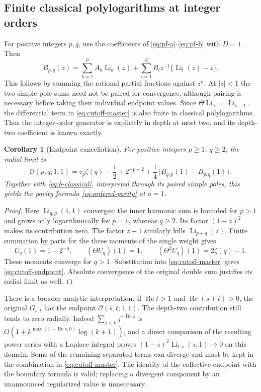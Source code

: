 \documentclass[11pt,a4paper]{article}
\numberwithin{equation}{section}
\newtheorem{corollary}[theorem]{Corollary}
\theoremstyle{definition}
\theoremstyle{remark}
\DeclareMathOperator{\Li}{Li}
\newcommand{\Rea}{\operatorname{Re}}
\newcommand{\Ord}{\mathcal O}
\begin{document}
\subsection{Finite classical polylogarithms at integer orders}

For positive integers $p,q$, use the coefficients of
\eqref{eq:pf-a}--\eqref{eq:pf-b} with $D=1$. Then
\begin{equation}\label{eq:b-classical}
 B_{p,q}(z)=\sum_{k=1}^{p}A_k\Li_k(z)
 +\sum_{l=1}^{q}B_lz^{-1}\{\Li_l(z)-z\}.
\end{equation}
This follows by summing the rational partial fractions against $z^n$.
At $|z|<1$ the two simple-pole sums need not be paired for convergence,
although pairing is necessary before taking their individual endpoint
values. Since $\Theta\Li_\nu=\Li_{\nu-1}$, the differential term in
\eqref{eq:cutoff-master} is also finite in classical polylogarithms.
Thus the integer-order generator is explicitly in depth at most two,
and its depth-two coefficient is known exactly.

\begin{corollary}[Endpoint cancellation]\label{cor:cutoff-endpoint}
For positive integers $p\ge1$, $q\ge2$, the radial limit is
\begin{equation}\label{eq:cutoff-endpoint}
 \Ord(p,q;1,1)=c_p\zeta(q)-\frac12+2^{-p-2}
 +\frac14\{B_{q,p}(1)-B_{p,q}(1)\}.
\end{equation}
Together with \eqref{eq:b-classical}, interpreted through its paired
simple poles, this yields the parity formula
\eqref{eq:ordered-parity} at $a=1$.
\end{corollary}

\begin{proof}
Here $\Li_{q,p}(1,1)$ converges: the inner harmonic sum is bounded
for $p>1$ and grows only logarithmically for $p=1$, whereas $q\ge2$.
Its factor $(1-z)^2$ makes its contribution zero. The factor
$z-1$ similarly kills $\Li_{p+q}(z)$.
Finite summation by parts for the three moments of the single weight
gives
\[
 U_q(1)=1-2^{-q},\qquad
 (\Theta U_q)(1)=1,\qquad
 (\Theta^2U_q)(1)=2\zeta(q)-1.
\]
These moments converge for $q>1$. Substitution into
\eqref{eq:cutoff-master} gives \eqref{eq:cutoff-endpoint}.
Absolute convergence of the original double sum justifies its radial
limit as well.
\end{proof}

There is a broader analytic interpretation. If $\Rea t>1$ and
$\Rea(s+t)>0$, the original $G_{s,t}$ has the endpoint
$\Ord(s,t;1,1)$. The depth-two contribution still tends to zero
radially. Indeed
$\sum_{j<k}j^{-\Rea s}$ is
$O(1+k^{\max(1-\Rea s,0)}\log(k+1))$, and a direct comparison of
the resulting power series with a Laplace integral proves
$(1-z)^2\Li_{t,s}(z,1)\to0$ on this domain. Some of the remaining
separated terms can diverge and must be kept in the combination in
\eqref{eq:cutoff-master}. The identity of the collective endpoint
with the boundary formula is valid; replacing a divergent component
by an unannounced regularized value is unnecessary.
\end{document}
